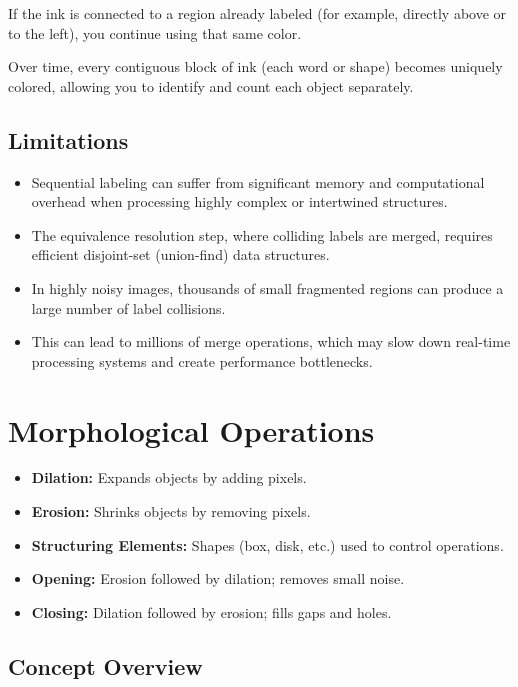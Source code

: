 \documentclass[12pt]{article}
\begin{document}
If the ink is connected to a region already labeled (for example, directly above or to the left), you continue using that same color.

Over time, every contiguous block of ink (each word or shape) becomes uniquely colored, allowing you to identify and count each object separately.

\subsection{Limitations}
\begin{itemize}
    \item Sequential labeling can suffer from significant memory and computational overhead when processing highly complex or intertwined structures.

    \item The equivalence resolution step, where colliding labels are merged, requires efficient disjoint-set (union-find) data structures.

    \item In highly noisy images, thousands of small fragmented regions can produce a large number of label collisions.

    \item This can lead to millions of merge operations, which may slow down real-time processing systems and create performance bottlenecks.
\end{itemize}


\section{Morphological Operations}
\begin{itemize}
    \item \textbf{Dilation:} Expands objects by adding pixels.
    \item \textbf{Erosion:} Shrinks objects by removing pixels.
    \item \textbf{Structuring Elements:} Shapes (box, disk, etc.) used to control operations.
    \item \textbf{Opening:} Erosion followed by dilation; removes small noise.
    \item \textbf{Closing:} Dilation followed by erosion; fills gaps and holes.
\end{itemize}

\subsection{Concept Overview}
\end{document}
